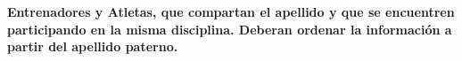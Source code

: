 \textbf{Entrenadores y Atletas, que compartan el apellido y que se encuentren participando en la misma disciplina.
Deberan ordenar la información a partir del apellido paterno.}\vspace{.3cm}